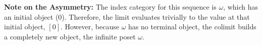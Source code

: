 \documentclass[11pt]{article}
\begin{document}
\vspace{1em}
\noindent\textbf{Note on the Asymmetry:} 
The index category for this sequence is $\omega$, which has an initial object ($0$). Therefore, the limit evaluates trivially to the value at that initial object, $[0]$. However, because $\omega$ has no terminal object, the colimit builds a completely new object, the infinite poset $\omega$.
\end{document}
